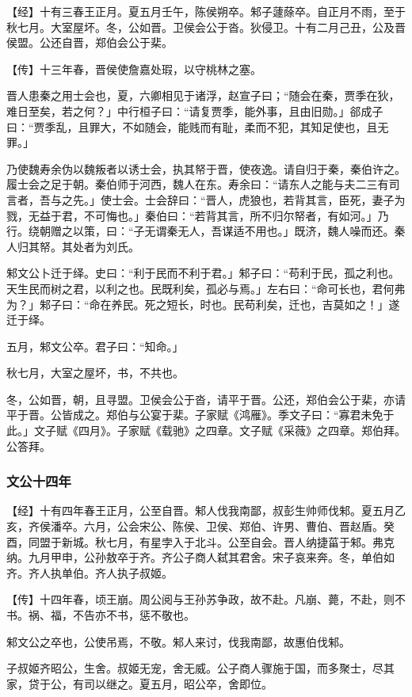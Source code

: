 \documentclass[]{article}
\begin{document}
【经】十有三春王正月。夏五月壬午，陈侯朔卒。邾子蘧蒢卒。自正月不雨，至于秋七月。大室屋坏。冬，公如晋。卫侯会公于沓。狄侵卫。十有二月己丑，公及晋侯盟。公还自晋，郑伯会公于棐。

【传】十三年春，晋侯使詹嘉处瑕，以守桃林之塞。

晋人患秦之用士会也，夏，六卿相见于诸浮，赵宣子曰；``随会在秦，贾季在狄，难日至矣，若之何？」中行桓子曰：``请复贾季，能外事，且由旧勋。」郤成子曰：``贾季乱，且罪大，不如随会，能贱而有耻，柔而不犯，其知足使也，且无罪。」

乃使魏寿余伪以魏叛者以诱士会，执其帑于晋，使夜逸。请自归于秦，秦伯许之。履士会之足于朝。秦伯师于河西，魏人在东。寿余曰：``请东人之能与夫二三有司言者，吾与之先。」使士会。士会辞曰：``晋人，虎狼也，若背其言，臣死，妻子为戮，无益于君，不可悔也。」秦伯曰：``若背其言，所不归尔帑者，有如河。」乃行。绕朝赠之以策，曰：``子无谓秦无人，吾谋适不用也。」既济，魏人噪而还。秦人归其帑。其处者为刘氏。

邾文公卜迁于绎。史曰：``利于民而不利于君。」邾子曰：``苟利于民，孤之利也。天生民而树之君，以利之也。民既利矣，孤必与焉。」左右曰：``命可长也，君何弗为？」邾子曰：``命在养民。死之短长，时也。民苟利矣，迁也，吉莫如之！」遂迁于绎。

五月，邾文公卒。君子曰：``知命。」

秋七月，大室之屋坏，书，不共也。

冬，公如晋，朝，且寻盟。卫侯会公于沓，请平于晋。公还，郑伯会公于棐，亦请平于晋。公皆成之。郑伯与公宴于棐。子家赋《鸿雁》。季文子曰：``寡君未免于此。」文子赋《四月》。子家赋《载驰》之四章。文子赋《采薇》之四章。郑伯拜。公答拜。

\hypertarget{header-n1209}{%
\subsubsection{文公十四年}\label{header-n1209}}

【经】十有四年春王正月，公至自晋。邾人伐我南鄙，叔彭生帅师伐邾。夏五月乙亥，齐侯潘卒。六月，公会宋公、陈侯、卫侯、郑伯、许男、曹伯、晋赵盾。癸酉，同盟于新城。秋七月，有星孛入于北斗。公至自会。晋人纳捷菑于邾。弗克纳。九月甲申，公孙敖卒于齐。齐公子商人弑其君舍。宋子哀来奔。冬，单伯如齐。齐人执单伯。齐人执子叔姬。

【传】十四年春，顷王崩。周公阅与王孙苏争政，故不赴。凡崩、薨，不赴，则不书。祸、福，不告亦不书，惩不敬也。

邾文公之卒也，公使吊焉，不敬。邾人来讨，伐我南鄙，故惠伯伐邾。

子叔姬齐昭公，生舍。叔姬无宠，舍无威。公子商人骤施于国，而多聚士，尽其家，贷于公，有司以继之。夏五月，昭公卒，舍即位。
\end{document}
